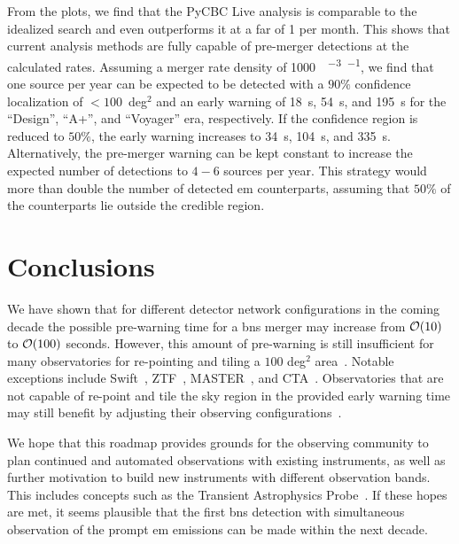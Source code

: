 From the plots, we find that the PyCBC Live analysis is comparable to the idealized search and even outperforms it at a \acrshort{far} of 1 per month. This shows that current analysis methods are fully capable of pre-merger detections at the calculated rates. Assuming a merger rate density of \SI{1000}{\giga\parsec^{-3}\years^{-1}}, we find that one source per year can be expected to be detected with a $90\%$ confidence localization of $<100$~deg$^2$ and an early warning of \SI{18}{\second}, \SI{54}{\second}, and \SI{195}{\second} for the ``Design'', ``A+'', and ``Voyager'' era, respectively. If the confidence region is reduced to $50\%$, the early warning increases to \SI{34}{\second}, \SI{104}{\second}, and \SI{335}{\second}. Alternatively, the pre-merger warning can be kept constant to increase the expected number of detections to $4-6$ sources per year. This strategy would more than double the number of detected \acrshort{em} counterparts, assuming that $50\%$ of the counterparts lie outside the credible region.
\newpage

\section{Conclusions}
We have shown that for different detector network configurations in the coming decade the possible pre-warning time for a \acrshort{bns} merger may increase from $\mathcal{O}{\left( 10 \right)}$ to $\mathcal{O}{\left( 100 \right)}$ seconds. However, this amount of pre-warning is still insufficient for many observatories for re-pointing and tiling a $100$ deg$^2$ area~\cite{Coughlin:2019qkn}. Notable exceptions include Swift~\cite{Tohuvavohu:2020stm}, ZTF~\cite{Bellm:2018aaa, Coughlin:2019xfb}, MASTER~\cite{Kornilov:2011fi}, and CTA~\cite{CTAConsortium:2013ofs}. Observatories that are not capable of re-point and tile the sky region in the provided early warning time may still benefit by adjusting their observing configurations~\cite{James:2019xca}.

We hope that this roadmap provides grounds for the observing community to plan continued and automated observations with existing instruments, as well as further motivation to build new instruments with different observation bands. This includes concepts such as the Transient Astrophysics Probe~\cite{Camp:2019aaa}. If these hopes are met, it seems plausible that the first \acrshort{bns} detection with simultaneous observation of the prompt \acrshort{em} emissions can be made within the next decade. 
